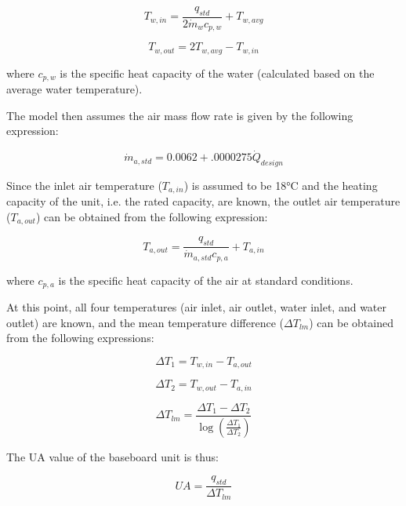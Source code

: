\begin{equation}
{T_{w,in}} = \frac{{{q_{std}}}}{{2\dot m{}_w{c_{p,w}}}} + {T_{w,avg}}
\end{equation}

\begin{equation}
{T_{w,out}} = 2{T_{w,avg}} - {T_{w,in}}
\end{equation}

where \({c_{p,w}}\) is the specific heat capacity of the water (calculated based on the average water temperature).

The model then assumes the air mass flow rate is given by the following expression:

\begin{equation}
\dot{m}_{a,std} = 0.0062 + .0000275 \dot{Q}_{design}
\end{equation}

Since the inlet air temperature (\({T_{a,in}}\)) is assumed to be 18°C and the heating capacity of the unit, i.e. the rated capacity, are known, the outlet air temperature (\({T_{a,out}}\)) can be obtained from the following expression:

\begin{equation}
T_{a,out} = \frac{q_{std}}{\dot{m}_{a,std}c_{p,a}} + T_{a,in}
\end{equation}

where \({c_{p,a}}\) is the specific heat capacity of the air at standard conditions.

At this point, all four temperatures (air inlet, air outlet, water inlet, and water outlet) are known, and the mean temperature difference (\(\Delta {T_{lm}}\)) can be obtained from the following expressions:

\begin{equation}
\Delta {T_1} = {T_{w,in}} - {T_{a,out}}
\end{equation}

\begin{equation}
\Delta {T_2} = {T_{w,out}} - {T_{a,in}}
\end{equation}

\begin{equation}
\Delta {T_{lm}} = \frac{{\Delta {T_1} - \Delta {T_2}}}{{\log \left( {\frac{{\Delta {T_1}}}{{\Delta {T_2}}}} \right)}}
\end{equation}

The UA value of the baseboard unit is thus:

\begin{equation}
UA = \frac{{{q_{std}}}}{{\Delta {T_{lm}}}}
\end{equation}

